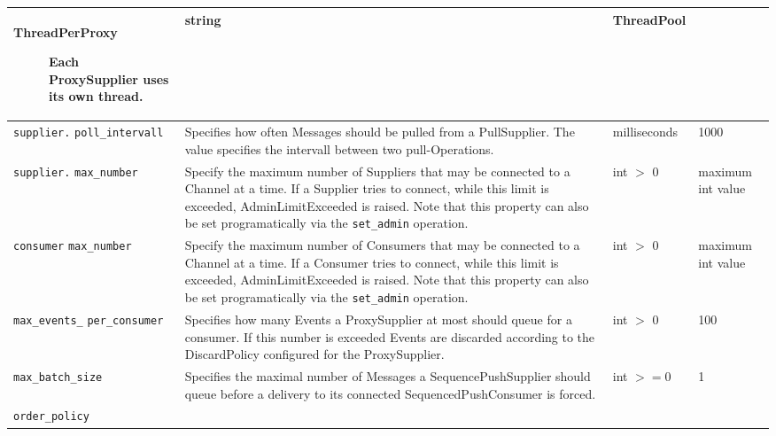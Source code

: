 \begin{small}
\begin{longtable}{|p{5cm}|p{7.5cm}|p{1.5cm}|p{1.5cm}|}
\begin{description}
    \item[ThreadPerProxy] Each ProxySupplier uses its own thread.

    \end{description} &
    string & Thread\-Pool \\ \hline

    \verb"supplier."
    \verb"poll_intervall" &

    Specifies how often Messages should be pulled from a PullSupplier. The
    value specifies the intervall between two pull-Operations. &

    milli\-seconds & 1000 \\ \hline

    \verb"supplier."
    \verb"max_number" &

    Specify the maximum number of Suppliers that may be connected to a
    Channel at a time. If a Supplier tries to connect, while this
    limit is exceeded, AdminLimitExceeded is raised. Note that this
    property can also be set programatically via the \texttt{set\_admin}
    operation. & int $>$ 0 & maximum int value \\ \hline

    \verb"consumer"
    \verb"max_number" &

    Specify the maximum number of Consumers that may be connected to a
    Channel at a time. If a Consumer tries to connect, while this
    limit is exceeded, AdminLimitExceeded is raised. Note that this
    property can also be set programatically via the
    \texttt{set\_admin} operation. &

    int $>$ 0 & maximum int value \\ \hline

    \verb"max_events_"
    \verb"per_consumer" &

    Specifies how many Events a ProxySupplier at most should queue for a
    consumer. If this number is exceeded Events are discarded according to
    the DiscardPolicy configured for the ProxySupplier. &

    int $>$ 0 & 100 \\ \hline

    \verb"max_batch_size" &

    Specifies the maximal number of Messages a SequencePushSupplier should
    queue before a delivery to its connected SequencedPushConsumer is
    forced. &

    int $>=0$ & 1 \\ \hline

    \verb"order_policy" &


\end{longtable}
\end{small}
